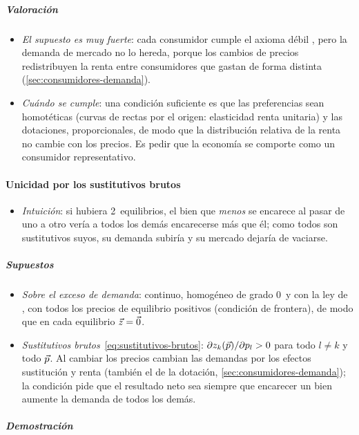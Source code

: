 \documentclass[11pt]{article}
\begin{document}
\subparagraph{Valoración}

\begin{itemize}
\item \emph{El supuesto es muy fuerte}: cada consumidor cumple el axioma débil , pero la demanda de mercado no lo hereda, porque los cambios de precios redistribuyen la renta entre consumidores que gastan de forma distinta (\ref{sec:consumidores-demanda}).
\item \emph{Cuándo se cumple}: una condición suficiente es que las preferencias sean homotéticas (curvas de  rectas por el origen: elasticidad renta unitaria) y las dotaciones, proporcionales, de modo que la distribución relativa de la renta no cambie con los precios\nocite{MasColellWhinstonGreen1995}. Es pedir que la economía se comporte como un consumidor representativo.
\end{itemize}

\paragraph{Unicidad por los sustitutivos brutos}

\begin{itemize}
\item \emph{Intuición}: si hubiera 2~equilibrios, el bien que \emph{menos} se encarece al pasar de uno a otro vería a todos los demás encarecerse más que él; como todos son sustitutivos suyos, su demanda subiría y su mercado dejaría de vaciarse.
\end{itemize}

\subparagraph{Supuestos}

\begin{itemize}
\item \emph{Sobre el exceso de demanda}: continuo, homogéneo de grado 0~y con la ley de , con todos los precios de equilibrio positivos (condición de frontera), de modo que en cada equilibrio $\vec{z}=\vec{0}$.
\item \emph{Sustitutivos brutos}~\eqref{eq:sustitutivos-brutos}: $\partial z_k(\vec{p})/\partial p_l>0$ para todo $l\neq k$ y todo $\vec{p}$. Al cambiar los precios cambian las demandas por los efectos sustitución y renta (también el de la dotación, \ref{sec:consumidores-demanda}); la condición pide que el resultado neto sea siempre que encarecer un bien aumente la demanda de todos los demás.
\end{itemize}

\subparagraph{Demostración}
\end{document}
